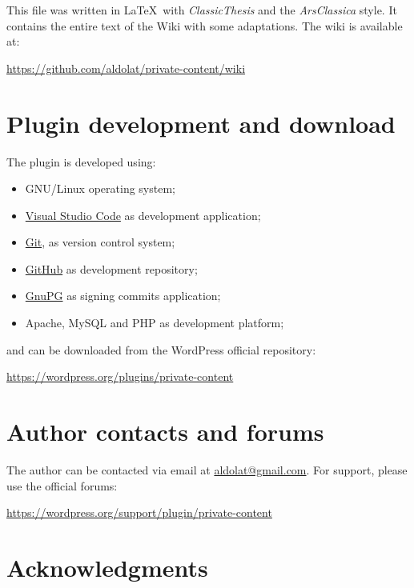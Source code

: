 \begingroup
	\footnotesize

	\noindent This file was written in \LaTeX~with \textit{ClassicThesis} and
	the \textit{ArsClassica} style. It contains the entire text of the Wiki with
	some adaptations. The wiki is available at:

	\begin{center}
		\url{https://github.com/aldolat/private-content/wiki}
	\end{center}

	\section*{Plugin development and download}

	\noindent The plugin is developed using:

	\begin{itemize}
		\item GNU/Linux operating system;
		\item \href{https://code.visualstudio.com}{Visual Studio Code} as development application;
		\item \href{https://git-scm.com}{Git}, as version control system;
		\item \href{https://github.com/aldolat/private-content}{GitHub} as development repository;
		\item \href{https://gnupg.org}{GnuPG} as signing commits application;
		\item Apache, MySQL and PHP as development platform;
	\end{itemize}

	and can be downloaded from the WordPress official repository:
	\begin{center}
	\url{https://wordpress.org/plugins/private-content}
	\end{center}

	\section*{Author contacts and forums}

	\noindent The author can be contacted via email at
	\href{mailto:aldolat@gmail.com}{aldolat@gmail.com}. For support, please use the
	official forums:
	\begin{center}
	\url{https://wordpress.org/support/plugin/private-content}
	\end{center}

	\section*{Acknowledgments}


